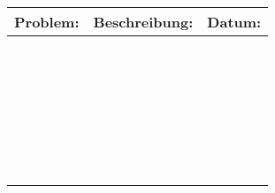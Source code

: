 \documentclass[landscape]{\basedir/fablab-document}
\newcommand{\head}{\bfseries \LARGE}
\begin{document}
\begin{tabularx}{\textwidth}{|l|X|r|}
	\hline
	\head Problem:	& \head Beschreibung:	& \head Datum:	\\ \hline \hline
					&						&				\\ \hline
					&						&				\\ \hline
					&						&				\\ \hline
					&						&				\\ \hline
					&						&				\\ \hline
					&						&				\\ \hline
					&						&				\\ \hline
					&						&				\\ \hline
					&						&				\\ \hline
					&						&				\\ \hline
					&						&				\\ \hline
					&						&				\\ \hline
					&						&				\\ \hline
					&						&				\\ \hline
					&						&				\\ \hline
					&						&				\\ \hline
					&						&				\\ \hline
					&						&				\\ \hline
					&						&				\\ \hline
					&						&				\\ \hline
					&						&				\\ \hline
					&						&				\\ \hline
					&						&				\\ \hline
					&						&				\\ \hline
					&						&				\\ \hline
					&						&				\\ \hline
					&						&				\\ \hline
					&						&				\\ \hline
\end{tabularx}
\end{document}
